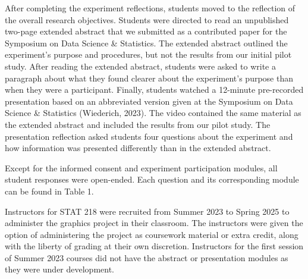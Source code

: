 \documentclass[phd]{nuthesis}
\begin{document}
After completing the experiment reflections, students moved to the
reflection of the overall research objectives. Students were directed to
read an unpublished two-page extended abstract that we submitted as a
contributed paper for the Symposium on Data Science \& Statistics. The
extended abstract outlined the experiment's purpose and procedures, but
not the results from our initial pilot study. After reading the extended
abstract, students were asked to write a paragraph about what they found
clearer about the experiment's purpose than when they were a
participant. Finally, students watched a 12-minute pre-recorded
presentation based on an abbreviated version given at the Symposium on
Data Science \& Statistics (Wiederich, 2023). The video contained the
same material as the extended abstract and included the results from our
pilot study. The presentation reflection asked students four questions
about the experiment and how information was presented differently than
in the extended abstract.

Except for the informed consent and experiment participation modules,
all student responses were open-ended. Each question and its
corresponding module can be found in Table 1.

Instructors for STAT 218 were recruited from Summer 2023 to Spring 2025
to administer the graphics project in their classroom. The instructors
were given the option of administering the project as coursework
material or extra credit, along with the liberty of grading at their own
discretion. Instructors for the first session of Summer 2023 courses did
not have the abstract or presentation modules as they were under
development.
\end{document}
